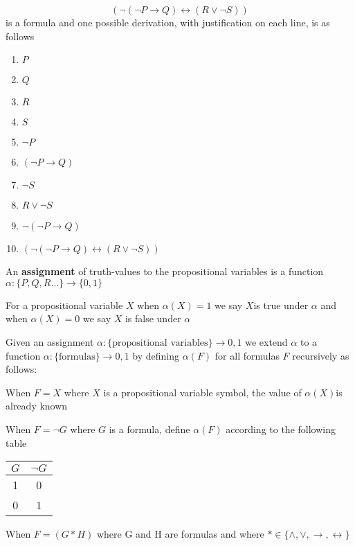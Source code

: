 \begin{exmp}
 $$(\neg (\neg P \to Q)\leftrightarrow(R\vee \neg S))$$ is a formula and one possible derivation, with justification on each line, is as follows

\begin{enumerate}
\item $P$
\item $Q$
\item $R$
\item $S$
\item $\neg P$
\item $(\neg P \to Q)$
\item $\neg S$
\item $R\vee \neg S$
\item $\neg (\neg P \to Q)$
\item $(\neg (\neg P \to Q)\leftrightarrow(R\vee \neg S))$
\end{enumerate}

\end{exmp}


\begin{defn}
An \textbf{assignment} of truth-values to the propositional variables is a function $\alpha \colon  \{P,Q,R\dots\} \to \{0,1\}$

For a propositional variable $X$ when $\alpha (X)=1$ we say $X $is true under $\alpha$ and when $\alpha (X)=0$ we say $X$ is false under $\alpha$
\end{defn}

Given an assignment $\alpha \colon \{\text{propositional variables}\} \to {0,1}$
we extend $\alpha$ to a function $\alpha \colon \{\text{formulas}\} \to {0,1}$
by defining $\alpha (F)$ for all formulas $F$ recursively as follows:

When $F=X$ where $X$ is a propositional variable symbol, the value of $\alpha (X)$is already known

When $F=\neg G$ where $G$ is a formula, define $\alpha (F)$ according to the following table
\begin{center}
\begin{tabular}{ c | c }
    $G$ & $\neg G$ \\
    \hline
    1 & 0 \\
    0 & 1 
\end{tabular}
\end{center}


When $F = (G\ast H)$
where G and H are formulas and where $\ast \in \{\wedge,\vee,\to,\leftrightarrow\} $


